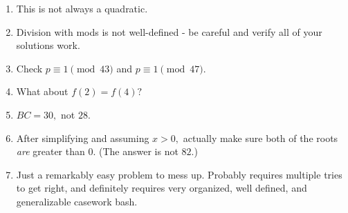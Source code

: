 \documentclass[mast]{lucky}
\begin{document}
\begin{enumerate}
    \item This is not always a quadratic.
    
    \item Division with mods is not well-defined - be careful and verify all of your solutions work.
    
    \item Check $p\equiv 1\pmod{43}$ and $p\equiv 1\pmod{47}.$
    
    \item What about $f(2)=f(4)?$
    
    \item $BC=30,$ not $28.$
    
    \item After simplifying and assuming $x>0,$ actually make sure both of the roots \textit{are} greater than $0.$ (The answer is not $82.$)
    
    \item Just a remarkably easy problem to mess up. Probably requires multiple tries to get right, and definitely requires very organized, well defined, and generalizable casework bash.
    
\end{enumerate}
\end{document}
